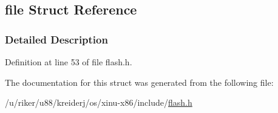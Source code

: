 \hypertarget{structfile}{}\subsection{file Struct Reference}
\label{structfile}


\subsubsection{Detailed Description}


Definition at line 53 of file flash.\+h.



The documentation for this struct was generated from the following file\+:\begin{DoxyCompactItemize}
\item 
/u/riker/u88/kreiderj/os/xinu-\/x86/include/\hyperlink{flash_8h}{flash.\+h}\end{DoxyCompactItemize}
